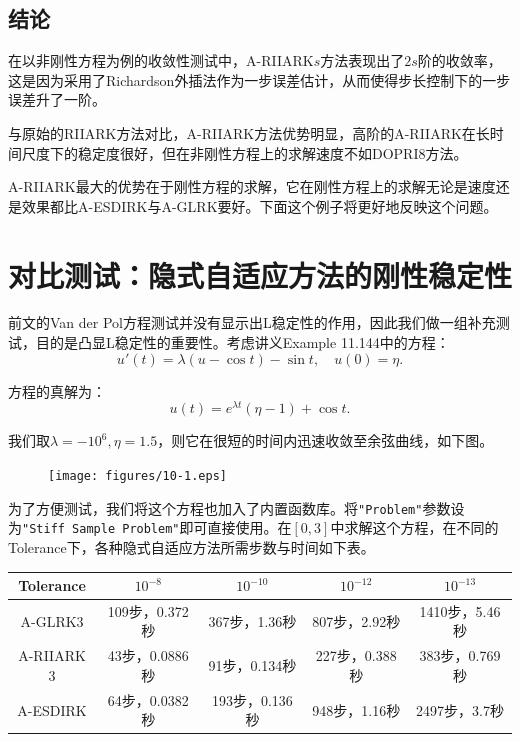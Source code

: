 \documentclass[lang=cn,10pt,bibend=bibtex]{elegantbook}
\begin{document}
\subsection{结论}

在以非刚性方程为例的收敛性测试中，A-RIIARK$s$方法表现出了$2s$阶的收敛率，这是因为采用了Richardson外插法作为一步误差估计，从而使得步长控制下的一步误差升了一阶。

与原始的RIIARK方法对比，A-RIIARK方法优势明显，高阶的A-RIIARK在长时间尺度下的稳定度很好，但在非刚性方程上的求解速度不如DOPRI8方法。

A-RIIARK最大的优势在于刚性方程的求解，它在刚性方程上的求解无论是速度还是效果都比A-ESDIRK与A-GLRK要好。下面这个例子将更好地反映这个问题。

\vspace{-1em}
\section{对比测试：隐式自适应方法的刚性稳定性}

\vspace{-.5em}
前文的Van der Pol方程测试并没有显示出L稳定性的作用，因此我们做一组补充测试，目的是凸显L稳定性的重要性。考虑讲义Example 11.144中的方程：
\begin{equation}
  u'(t)=\lambda(u-\cos t)-\sin t,\quad u(0)=\eta.
\end{equation}

方程的真解为：
\begin{equation}
  u(t)=e^{\lambda t}(\eta-1)+\cos t.
\end{equation}

我们取$\lambda=-10^6,\eta=1.5$，则它在很短的时间内迅速收敛至余弦曲线，如下图。

\vspace{-.5em}
\begin{figure}[H]
  \centering
  \texttt{[image: figures/10-1.eps]}
\end{figure}
\vspace{-.5em}

为了方便测试，我们将这个方程也加入了内置函数库。将\verb|"Problem"|参数设为\verb|"Stiff Sample Problem"|即可直接使用。在$[0,3]$中求解这个方程，在不同的Tolerance下，各种隐式自适应方法所需步数与时间如下表。

\vspace{-.3em}
\begin{table}[H]
  \centering
  \begin{tabular}{c|cccc}
    Tolerance & $10^{-8}$ & $10^{-10}$ & $10^{-12}$ & $10^{-13}$ \\ \hline
    A-GLRK$3$ & 109步，0.372秒\;\;\;\; & 367步，1.36秒\;\;\;\; & 807步，2.92秒\;\;\;\; & 1410步，5.46秒 \\
    A-RIIARK$3$ & 43步，0.0886秒\;\;\;\; & 91步，0.134秒\;\;\;\; & 227步，0.388秒\;\;\;\; & 383步，0.769秒 \\
    A-ESDIRK & 64步，0.0382秒\;\;\;\; & 193步，0.136秒\;\;\;\; & 948步，1.16秒\;\;\;\; & 2497步，3.7秒
  \end{tabular}
\end{table}
\vspace{-.8em}
\end{document}
